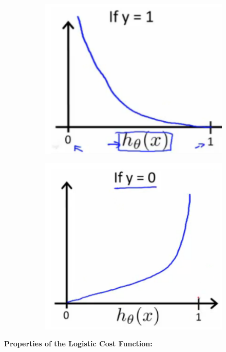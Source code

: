 \begin{figure}[hbt!]
    \centering
    \begin{subfigure}[b]{.45\linewidth}
        \includegraphics[scale=0.6]{Resources/Log_Model}
    \end{subfigure}
    \begin{subfigure}[b]{.45\linewidth}
        \includegraphics[scale=0.6]{Resources/Log_Model2}
    \end{subfigure}
\end{figure}

\noindent \textbf{Properties of the Logistic Cost Function:}

